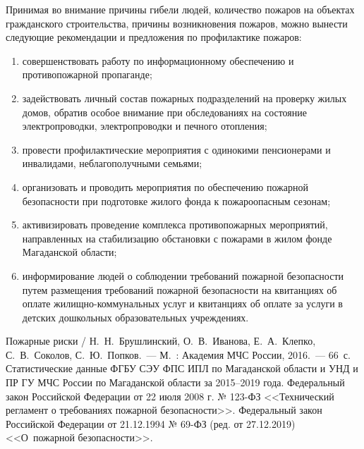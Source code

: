 Принимая во внимание причины гибели людей, количество пожаров на объектах гражданского строительства, причины возникновения пожаров, можно вынести следующие рекомендации и предложения по профилактике пожаров:
\begin{enumerate}[noitemsep]\vspace{-8pt}
  \item совершенствовать работу по информационному обеспечению и противопожарной пропаганде;
  \item задействовать личный состав пожарных подразделений на проверку жилых домов, обратив особое внимание при обследованиях на состояние электропроводки, электропроводки и печного отопления;
  \item провести профилактические мероприятия с одинокими пенсионерами и инвалидами, неблагополучными семьями;
  \item организовать и проводить мероприятия по обеспечению пожарной безопасности при подготовке жилого фонда к пожароопасным сезонам;
  \item активизировать проведение комплекса противопожарных мероприятий, направленных на стабилизацию обстановки с пожарами в жилом фонде Магаданской области;
  \item информирование людей о соблюдении требований пожарной безопасности путем размещения требований пожарной безопасности на квитанциях об оплате жилищно-коммунальных услуг и квитанциях об оплате за услуги в детских дошкольных образовательных учреждениях.
\end{enumerate}
\vspace{-8pt}

\begin{thebibliography}{99}
\bibitem{}Пожарные риски / Н.~Н.~Брушлинский, О.~В.~Иванова, Е.~А.~Клепко, С.~В.~Соколов, С.~Ю.~Попков.~--- М.~: Академия МЧС России, 2016.~--- 66~с.
\bibitem{}Статистические данные ФГБУ СЭУ ФПС ИПЛ по Магаданской области и УНД и ПР ГУ МЧС России по Магаданской области за 2015--2019 года.
\bibitem{}Федеральный закон Российской Федерации от 22 июля 2008 г. № 123-ФЗ  <<Технический регламент о требованиях пожарной безопасности>>.
\bibitem{}Федеральный закон Российской Федерации от 21.12.1994 № 69-ФЗ (ред. от 27.12.2019) <<О~пожарной безопасности>>.
\end{thebibliography}
